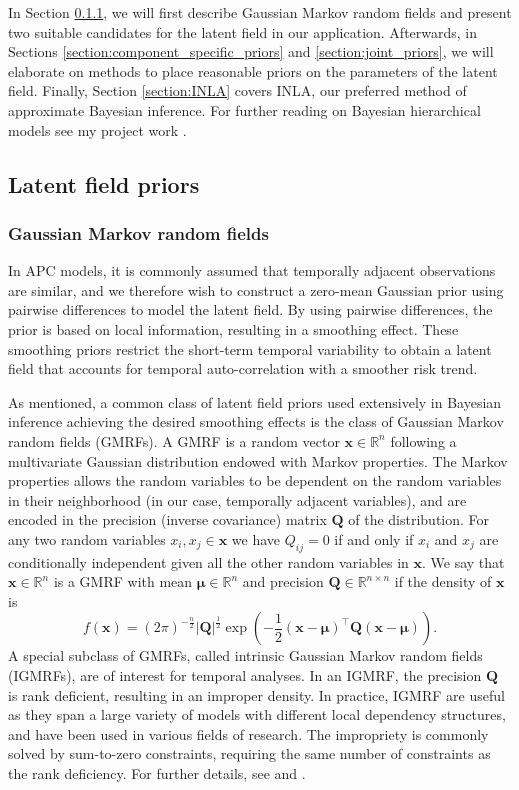 In Section \ref*{section:gmrf}, we will first describe Gaussian Markov random fields and present two suitable candidates for the latent field in our application. Afterwards, in Sections \ref{section:component_specific_priors} and \ref{section:joint_priors}, we will elaborate on methods to place reasonable priors on the parameters of the latent field. Finally, Section \ref{section:INLA} covers INLA, our preferred method of approximate Bayesian inference. For further reading on Bayesian hierarchical models see my project work \citep{Prosjektoppgave}. 

\subsection{Latent field priors}

\subsubsection{Gaussian Markov random fields}
\label{section:gmrf}
In APC models, it is commonly assumed that temporally adjacent observations are similar, and we therefore wish to construct a zero-mean Gaussian prior using pairwise differences to model the latent field. By using pairwise differences, the prior is based on local information, resulting in a smoothing effect. These smoothing priors restrict the short-term temporal variability to obtain a latent field that accounts for temporal auto-correlation with a smoother risk trend. 

As mentioned, a common class of latent field priors used extensively in Bayesian inference achieving the desired smoothing effects is the class of Gaussian Markov random fields (GMRFs). A GMRF is a random vector $\pmb x \in \mathbb{R}^n$ following a multivariate Gaussian distribution endowed with Markov properties. The Markov properties allows the random variables to be dependent on the random variables in their neighborhood (in our case, temporally adjacent variables), and are encoded in the precision (inverse covariance) matrix $\pmb Q$ of the distribution. For any two random variables $x_i,x_j \in \pmb x$ we have $Q_{ij}=0$ if and only if $x_i$ and $x_j$ are conditionally independent given all the other random variables in $\pmb x$. We say that $\pmb x\in \mathbb{R}^n$ is a GMRF with mean $\pmb \mu\in\mathbb{R}^n$ and precision $\pmb Q\in \mathbb{R}^{n\times n}$ if the density of $\pmb x$ is 
\begin{equation*}
    f(\pmb x) = (2\pi)^{-\frac{n}{2}}|\pmb Q |^{\frac{1}{2}}\exp\left(-\frac{1}{2}(\pmb x - \pmb \mu)^\top \pmb Q (\pmb x - \pmb \mu)\right).
\end{equation*}
A special subclass of GMRFs, called intrinsic Gaussian Markov random fields (IGMRFs), are of interest for temporal analyses. In an IGMRF, the precision $\pmb Q$ is rank deficient, resulting in an improper density. In practice, IGMRF are useful as they span a large variety of models with different local dependency structures, and have been used in various fields of research. The impropriety is commonly solved by sum-to-zero constraints, requiring the same number of constraints as the rank deficiency. For further details, see \cite{GMRF} and \cite{Prosjektoppgave}. 

